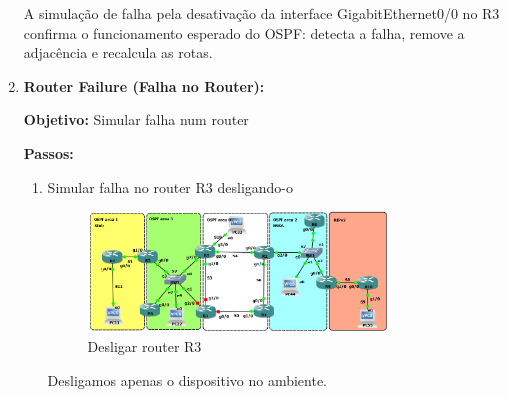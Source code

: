 \documentclass[11pt,english, openright, oneside]{book}
\begin{document}
\begin{enumerate}
        A simulação de falha pela desativação da interface GigabitEthernet0/0 no R3 confirma o funcionamento esperado do OSPF: detecta a falha, remove a adjacência e recalcula as rotas.
  \pagebreak
  \item \textbf{Router Failure (Falha no Router):} \par \vspace{0.2cm}
  \textbf{Objetivo:} Simular falha num router \par \vspace{0.2cm}
  \textbf{Passos:}
        \begin{enumerate}
          \item Simular falha no router R3 desligando-o
          \begin{figure}[H]
            \centering
            \includegraphics[width=0.8\textwidth]{imagens/Tarefa6/31.router_failure_1.png}
            \caption{Desligar router R3}
            \label{fig:config47}
          \end{figure}
            Desligamos apenas o dispositivo no ambiente.
            \vspace{0.4cm}


\end{enumerate}
\end{enumerate}
\end{document}
